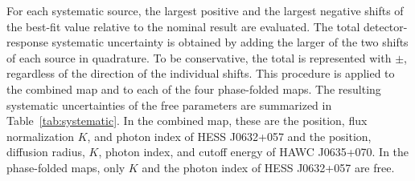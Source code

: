 \documentclass[10pt,letter]{article}
\begin{document}
For each systematic source, the largest positive and the largest negative shifts of the best-fit value relative to the nominal result are evaluated. The total detector-response systematic uncertainty is obtained by adding the larger of the two shifts of each source in quadrature. To be conservative, the total is represented with $\pm$, regardless of the direction of the individual shifts. This procedure is applied to the combined map and to each of the four phase-folded maps. The resulting systematic uncertainties of the free parameters are summarized in Table~\ref{tab:systematic}. In the combined map, these are the position, flux normalization $K$, and photon index of HESS J0632+057 and the position, diffusion radius, $K$, photon index, and cutoff energy of HAWC J0635+070. In the phase-folded maps, only $K$ and the photon index of HESS J0632+057 are free.
\end{document}
